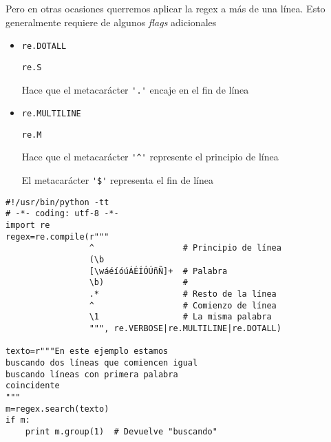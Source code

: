 \documentclass[ucs]{beamer}
\begin{document}
\begin{frame}[fragile]
Pero en otras ocasiones querremos aplicar la regex a 
más de una línea. Esto generalmente requiere de algunos
\emph{flags} adicionales
\begin{itemize}
\item
\verb|re.DOTALL|

\verb|re.S|

Hace que el metacarácter \verb|'.'|  encaje en el fin de línea

\item
\verb|re.MULTILINE|

\verb|re.M|

Hace que el metacarácter \verb|'^'| represente el principio de línea 

El metacarácter \verb|'$'| representa el fin de línea
\end{itemize}

\end{frame}


\begin{frame}[fragile]

  \begin{footnotesize}
  \begin{verbatim}
#!/usr/bin/python -tt
# -*- coding: utf-8 -*-
import re
regex=re.compile(r"""
                 ^                  # Principio de línea
                 (\b
                 [\wáéíóúÁÉÍÓÚñÑ]+  # Palabra
                 \b)                # 
                 .*                 # Resto de la línea
                 ^                  # Comienzo de línea
                 \1                 # La misma palabra
                 """, re.VERBOSE|re.MULTILINE|re.DOTALL)

texto=r"""En este ejemplo estamos
buscando dos líneas que comiencen igual
buscando líneas con primera palabra 
coincidente
"""
m=regex.search(texto)
if m:
    print m.group(1)  # Devuelve "buscando"
  \end{verbatim}
  \end{footnotesize}
\end{frame}
\end{document}
